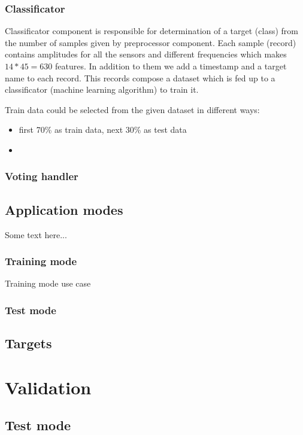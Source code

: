 \documentclass[12pt]{article}
\begin{document}
\subsubsection{Classificator}

Classificator component is responsible for determination of a target (class) from the number of samples given by preprocessor component. Each sample (record) contains amplitudes for all the sensors and different frequencies which makes $14*45=630$ features. In addition to them we add a timestamp and a target name to each record. This records compose a dataset which is fed up to a classificator (machine learning algorithm) to train it. 

Train data could be selected from the given dataset in different ways:

\begin{itemize}
\item first 70\% as train data, next 30\% as test data
\item  
\end{itemize}

\subsubsection{Voting handler}

\subsection{Application modes}
Some text here...
\subsubsection{Training mode}
Training mode use case
\subsubsection{Test mode}

\subsection{Targets}

\newpage
\section{Validation}

\subsection{Test mode}
\end{document}
